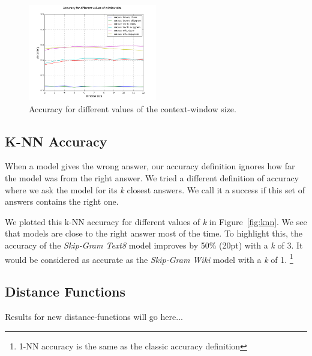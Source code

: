 \documentclass[conference]{IEEEtran}
\begin{document}
\begin{figure}[t]
\centering
\includegraphics[width=0.5\textwidth]{graph_acc_window}
\caption{Accuracy for different values of the context-window size. }
\label{fig:window}
\end{figure}

\subsection{K-NN Accuracy}
When a model gives the wrong answer, our accuracy definition ignores how far the model was from the right answer.
We tried a different definition of accuracy where we ask the model for its \textit{k} closest answers.
We call it a success if this set of answers contains the right one.

We plotted this k-NN accuracy for different values of \textit{k} in Figure~\ref{fig:knn}.
We see that models are close to the right answer most of the time.
To highlight this, the accuracy of the \textit{Skip-Gram Text8} model improves by 50\% (20pt) with a \textit{k} of 3.
It would be considered as accurate as the \textit{Skip-Gram Wiki} model with a \textit{k} of 1.
\footnote{1-NN accuracy is the same as the classic accuracy definition}

\subsection{Distance Functions}
Results for new distance-functions will go here...

%
%
\end{document}

